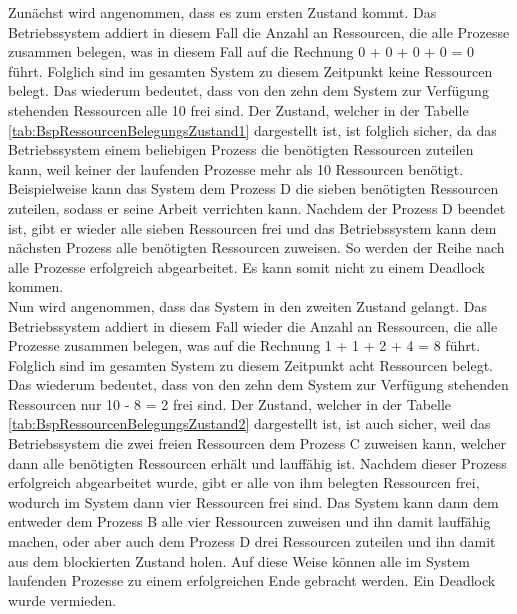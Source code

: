 \begin{description}
\begin{description}
								Zunächst wird angenommen, dass es zum ersten Zustand kommt. Das Betriebssystem addiert in diesem Fall die Anzahl an Ressourcen, die alle Prozesse zusammen belegen, was in diesem Fall auf die Rechnung 0 + 0 + 0 + 0 = 0 führt. Folglich sind im gesamten System zu diesem Zeitpunkt keine Ressourcen belegt. Das wiederum bedeutet, dass von den zehn dem System zur Verfügung stehenden Ressourcen alle 10 frei sind. Der Zustand, welcher in der Tabelle \ref{tab:BspRessourcenBelegungsZustand1} dargestellt ist, ist folglich sicher, da das Betriebssystem einem beliebigen Prozess die benötigten Ressourcen zuteilen kann, weil keiner der laufenden Prozesse mehr als 10 Ressourcen benötigt. Beispielweise kann das System dem Prozess D die sieben benötigten Ressourcen zuteilen, sodass er seine Arbeit verrichten kann. Nachdem der Prozess D beendet ist, gibt er wieder alle sieben Ressourcen frei und das Betriebssystem kann dem nächsten Prozess alle benötigten Ressourcen zuweisen. So werden der Reihe nach alle Prozesse erfolgreich abgearbeitet. Es kann somit nicht zu einem Deadlock kommen.\\
								Nun wird angenommen, dass das System in den zweiten Zustand gelangt. Das Betriebssystem addiert in diesem Fall wieder die Anzahl an Ressourcen, die alle Prozesse zusammen belegen, was auf die Rechnung 1 + 1 + 2 + 4 = 8 führt. Folglich sind im gesamten System zu diesem Zeitpunkt acht Ressourcen belegt. Das wiederum bedeutet, dass von den zehn dem System zur Verfügung stehenden Ressourcen nur 10 - 8 = 2 frei sind. Der Zustand, welcher in der Tabelle \ref{tab:BspRessourcenBelegungsZustand2} dargestellt ist, ist auch sicher, weil das Betriebssystem die zwei freien Ressourcen dem Prozess C zuweisen kann, welcher dann alle benötigten Ressourcen erhält und lauffähig ist. Nachdem dieser Prozess erfolgreich abgearbeitet wurde, gibt er alle von ihm belegten Ressourcen frei, wodurch im System dann vier Ressourcen frei sind. Das System kann dann dem entweder dem Prozess B alle vier Ressourcen zuweisen und ihn damit lauffähig machen, oder aber auch dem Prozess D drei Ressourcen zuteilen und ihn damit aus dem blockierten Zustand holen. Auf diese Weise können alle im System laufenden Prozesse zu einem erfolgreichen Ende gebracht werden. Ein Deadlock wurde vermieden.\\

\end{description}
\end{description}
